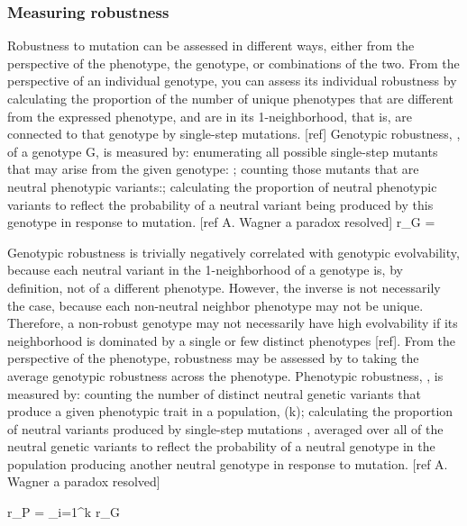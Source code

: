 \subsubsection{Measuring robustness}

Robustness to mutation can be assessed in different ways, either from the perspective of the phenotype, the genotype, or combinations of the two.  From the perspective of an individual genotype, you can assess its individual robustness by calculating the proportion of the number of unique phenotypes that are different from the expressed phenotype, and are in its 1-neighborhood, that is, are connected to that genotype by single-step mutations. [ref]
Genotypic robustness, , of a genotype G, is measured by:
enumerating all possible single-step mutants that may arise from the given genotype: ;
counting those mutants that are neutral phenotypic variants:;
calculating the proportion of neutral phenotypic variants to reflect the probability of a neutral variant being produced by this genotype in response to mutation. [ref A. Wagner a paradox resolved]
r_{G} =  
 

Genotypic robustness is trivially negatively correlated with genotypic evolvability, because each neutral variant in the 1-neighborhood of a genotype is, by definition, not of a different phenotype. However, the inverse is not necessarily the case, because each non-neutral neighbor phenotype may not be unique. Therefore, a non-robust genotype may not necessarily have high evolvability if its neighborhood is dominated by a single or few distinct phenotypes [ref].
From the perspective of the phenotype, robustness may be assessed by to taking the average genotypic robustness across the phenotype.
Phenotypic robustness, , is measured by:
counting the number of distinct neutral genetic variants that produce a given phenotypic trait in a population, (k);
calculating the proportion of neutral variants produced by single-step mutations , averaged over all of the neutral genetic variants to reflect the probability of a neutral genotype in the population producing another neutral genotype in response to mutation. [ref A. Wagner a paradox resolved]

r_{P} =   \sum_{i=1}^{k} r_{G} 


